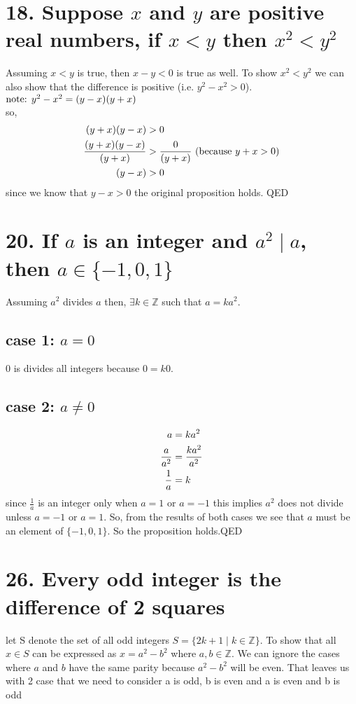 \documentclass{article}
\begin{document}
\section*{18. Suppose $x$ and $y$ are positive real numbers, if $x < y$ then $x^2 < y^2 $ }
Assuming $x < y $ is true, then $x-y < 0$ is true as well. To show $x^2 < y^2$ we can also show that the difference is positive (i.e. $y^2-x^2>0$).
 $\text{note: \hfil} y^2-x^2 =(y-x)(y+x)$ \\
 so,  
\begin{equation}\notag
 	\begin{aligned}
 		(y+x)(y-x)&>0\\
 		\frac{(y+x)(y-x)}{(y+x)}&>\frac{0}{(y+x)} \text{ (because $y+x>0$)}\\
 		(y-x)&>0\\
 	\end{aligned}
\end{equation}
 	since we know that $y-x > 0$ the original proposition holds. \hfill QED
  
\section*{20. If $a$ is an integer and $a^2 \mid a$, then $a \in \lbrace -1,0,1\rbrace$ }
Assuming $a^2$ divides $a$ then, $\exists k \in \mathbb{Z}$ such that $a = ka^2$.
\subsection*{case 1: $a = 0$} 
0 is divides all integers because $0 = k0$.

\subsection*{case 2: $a \not= 0$}
\begin{equation}\notag
		\begin{aligned}
		a &= ka^2\\
		\frac{a}{a^2} &= \frac{ka^2}{a^2}\\
		\frac{1}{a} &= k\\
		\end{aligned}
	\end{equation}
since $\frac{1}{a}$ is an integer only when $a = 1$ or $a=-1$  this implies $a^2$ does not divide unless $a = -1 \text{ or } a = 1$. So, from the results of both cases we see that $a$ must be an element of $\lbrace -1,0,1 \rbrace$. So the proposition holds.\hfill QED
\section*{26. Every odd integer is the difference of 2 squares}
let S denote the set of all odd integers $S = \lbrace 2k+1 \mid k \in \mathbb{Z} \rbrace$. To show that all $x \in S$ can be expressed as $x=a^2-b^2$ where $a,b \in \mathbb{Z}$. We can ignore the cases where $a$ and $b$ have the same parity because $a^2-b^2$ will be even. That leaves us with 2 case that we need to consider a is odd, b is even and a is even and b is odd 
\end{document}
